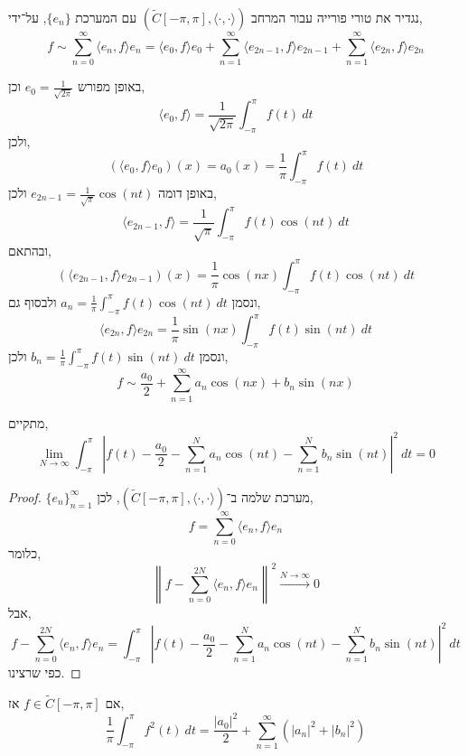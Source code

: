 \begin{definition}
	נגדיר את טורי פורייה עבור המרחב $(\tilde{C}[-\pi, \pi], \langle \cdot, \cdot \rangle)$ עם המערכת ${\{ e_n \}}$, על־ידי,
	\[
		f
		\sim \sum_{n = 0}^\infty \langle e_n, f \rangle e_n
		= \langle e_0, f \rangle e_0 + \sum_{n = 1}^\infty \langle e_{2n - 1}, f \rangle e_{2n - 1} + \sum_{n = 1}^\infty \langle e_{2n}, f \rangle e_{2n}
	\]
\end{definition}
\begin{remark}
	באופן מפורש $e_0 = \frac{1}{\sqrt{2 \pi}}$ וכן,
	\[
		\langle e_0, f \rangle = \frac{1}{\sqrt{2 \pi}} \int_{-\pi}^{\pi} f(t)\ dt
	\]
	ולכן,
	\[
		(\langle e_0, f \rangle e_0)(x)
		= a_0(x)
		= \frac{1}{\pi} \int_{-\pi}^{\pi} f(t)\ dt
	\]
	באופן דומה $e_{2n - 1} = \frac{1}{\sqrt{\pi}} \cos(nt)$ ולכן,
	\[
		\langle e_{2n - 1}, f \rangle
		= \frac{1}{\sqrt{\pi}} \int_{-\pi}^{\pi} f(t) \cos(nt)\ dt
	\]
	ובהתאם,
	\[
		(\langle e_{2n - 1}, f \rangle e_{2n - 1})(x)
		= \frac{1}{\pi} \cos(nx) \int_{-\pi}^{\pi} f(t) \cos(nt)\ dt
	\]
	ונסמן $a_n = \frac{1}{\pi} \int_{-\pi}^{\pi} f(t) \cos(nt)\ dt$
	ולבסוף גם,
	\[
		\langle e_{2n}, f \rangle e_{2n}
		= \frac{1}{\pi} \sin(nx) \int_{-\pi}^{\pi} f(t) \sin(nt)\ dt
	\]
	ונסמן $b_n = \frac{1}{\pi} \int_{-\pi}^{\pi} f(t) \sin(nt)\ dt$
	ולכן,
	\[
		f \sim \frac{a_0}{2} + \sum_{n = 1}^\infty a_n \cos(nx) + b_n \sin(nx)
	\]
\end{remark}
\begin{corollary}
	מתקיים,
	\[
		\lim_{N \to \infty} 
		\int_{-\pi}^{\pi} {\left\lvert f(t) - \frac{a_0}{2} - \sum_{n = 1}^N a_n \cos(nt) - \sum_{n = 1}^N b_n \sin(nt) \right\rvert}^2\ dt
		= 0
	\]
\end{corollary}
\begin{proof}
	${\{ e_n \}}_{n = 1}^\infty$ מערכת שלמה ב־$(\tilde{C}[-\pi, \pi], \langle \cdot, \cdot \rangle)$,
	לכן,
	\[
		f = \sum_{n = 0}^\infty \langle e_n, f \rangle e_n
	\]
	כלומר,
	\[
		{\left\lVert f - \sum_{n = 0}^{2N} \langle e_n, f \rangle e_n \right\rVert}^2
		\xrightarrow{N \to \infty} 0
	\]
	אבל,
	\[
		f - \sum_{n = 0}^{2N} \langle e_n, f \rangle e_n
		= \int_{-\pi}^{\pi} {\left\lvert f(t) - \frac{a_0}{2} - \sum_{n = 1}^N a_n \cos(nt) - \sum_{n = 1}^N b_n \sin(nt) \right\rvert}^2\ dt
	\]
	כפי שרצינו.
\end{proof}
\begin{corollary}
	אם $f \in \tilde{C}[-\pi, \pi]$ אז,
	\[
		\frac{1}{\pi} \int_{-\pi}^{\pi} f^2(t)\ dt
		= \frac{{|a_0|}^2}{2} + \sum_{n = 1}^\infty ({| a_n |}^2 + {| b_n |}^2)
	\]
\end{corollary}
